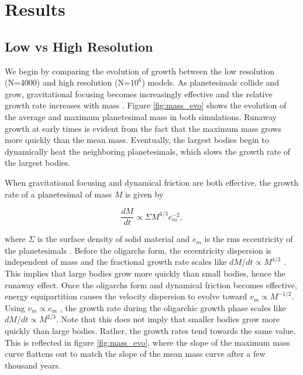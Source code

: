 
\section{Results} \label{sec:plSS_results}

\subsection{Low vs High Resolution}\label{sec:lowvshigh}

We begin by comparing the evolution of growth between the low resolution (N=4000) and high resolution (N=$10^{6}$) models. 
As planetesimals collide and grow, gravitational focusing becomes increasingly effective and the relative growth rate increases 
with mass \cite{greenberg78}. Figure \ref{fig:mass_evo} shows the evolution of the average and maximum planetesimal 
mass in both simulations. Runaway growth at early times is evident from the fact that the maximum mass grows more quickly 
than the mean mass. Eventually, the largest bodies begin to dynamically heat the neighboring planetesimals, which slows the 
growth rate of the largest bodies.

When gravitational focusing and dynamical friction are both effective, the growth rate of a planetesimal of mass $M$ is given by

\begin{equation}\label{eq:growth_rate}
\frac{dM}{dt} \propto \Sigma M^{4/3} e_{m}^{-2},
\end{equation}

\noindent where $\Sigma$ is the surface density of solid material and $e_m$ is the rms eccentricity of the planetesimals 
\cite{kokubo95}. Before the oligarchs form, the eccentricity dispersion is independent of mass and the fractional growth rate 
scales like $dM/dt \propto M^{4/3}$ \cite{wetherill93}. This implies that large bodies grow more quickly than small bodies, hence 
the runaway effect. Once the oligarchs form and dynamical friction becomes effective, energy equipartition causes the velocity 
dispersion to evolve toward $v_m \propto M^{-1/2}$\cite{ida93a}. Using $v_m \propto e_m$ \cite{lissauer93}, the growth rate 
during the oligarchic growth phase scales like  $dM/dt \propto M^{2/3}$. Note that this does not imply that smaller bodies grow 
more quickly than large bodies. Rather, the growth rates tend towards the same value. This is reflected in figure 
\ref{fig:mass_evo}, where the slope of the maximum mass curve flattens out to match the slope of the mean mass curve after a 
few thousand years.

